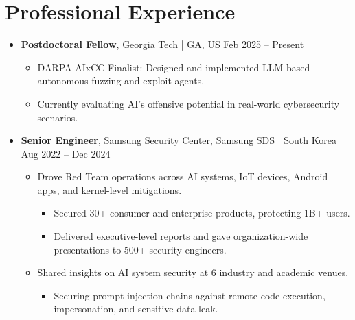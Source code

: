 \documentclass[11pt,letterpaper]{article}
\newcommand{\jobtitle}[1]{\textbf{#1}}
\newcommand{\location}[1]{\textcolor{secondary}{\small #1}}
\newcommand{\daterange}[1]{\textcolor{secondary}{\small #1}}
\begin{document}
\section{Professional Experience}
\begin{itemize}
\item \jobtitle{Postdoctoral Fellow}, \location{Georgia Tech | GA, US} \hfill \daterange{Feb 2025 -- Present}
    \begin{itemize}[] %
    \item DARPA AIxCC Finalist: Designed and implemented LLM-based autonomous fuzzing and exploit agents.
    \item Currently evaluating AI's offensive potential in real-world cybersecurity scenarios.
    \end{itemize}

\item \jobtitle{Senior Engineer}, \location{Samsung Security Center, Samsung SDS | South Korea} \hfill \daterange{Aug 2022 -- Dec 2024}
    \begin{itemize}[] %
    \item Drove Red Team operations across AI systems, IoT devices, Android apps, and kernel-level mitigations.
        \begin{itemize}[] %
        \item Secured 30+ consumer and enterprise products, protecting 1B+ users.
        \item Delivered executive-level reports and gave organization-wide presentations to 500+ security engineers.
        \end{itemize}
    \item Shared insights on AI system security at 6 industry and academic venues.
        \begin{itemize}[]
        \item Securing prompt injection chains against remote code execution, impersonation, and sensitive data leak.
        \end{itemize}
    \end{itemize}


\end{itemize}
\end{document}
